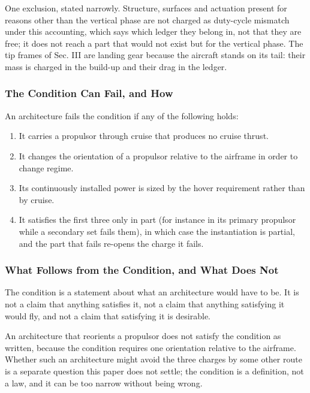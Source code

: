 \documentclass[journal]{new-aiaa}
\begin{document}
One exclusion, stated narrowly. Structure, surfaces and actuation present for reasons other than the vertical phase are not charged as duty-cycle mismatch under this accounting, which says which ledger they belong in, not that they are free; it does not reach a part that would not exist but for the vertical phase. The tip frames of Sec. III are landing gear because the aircraft stands on its tail: their mass is charged in the build-up and their drag in the ledger.

\subsubsection{The Condition Can Fail, and How}

An architecture fails the condition if any of the following holds:

\begin{enumerate}[label=\arabic*)]
\item It carries a propulsor through cruise that produces no cruise thrust.
\item It changes the orientation of a propulsor relative to the airframe in order to change regime.
\item Its continuously installed power is sized by the hover requirement rather than by cruise.
\item It satisfies the first three only in part (for instance in its primary propulsor while a secondary set fails them), in which case the instantiation is partial, and the part that fails re-opens the charge it fails.
\end{enumerate}

\subsubsection{What Follows from the Condition, and What Does Not}

The condition is a statement about what an architecture would have to be. It is not a claim that anything satisfies it, not a claim that anything satisfying it would fly, and not a claim that satisfying it is desirable.

An architecture that reorients a propulsor does not satisfy the condition as written, because the condition requires one orientation relative to the airframe. Whether such an architecture might avoid the three charges by some other route is a separate question this paper does not settle; the condition is a definition, not a law, and it can be too narrow without being wrong.
\end{document}

